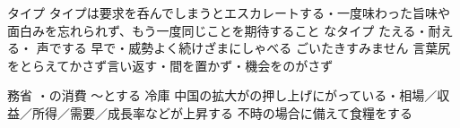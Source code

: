 タイプ
タイプは要求を呑んでしまうとエスカレートする・一度味わった旨味や面白みを忘れられず、もう一度同じことを期待すること
なタイプ
たえる・耐える・
声でする
早で・威勢よく続けざまにしゃべる
ごいたきすみません
言葉尻をとらえてかさず言い返す・間を置かず・機会をのがさず

務省
・の消費
〜とする
冷庫
中国の拡大がの押し上げにがっている・相場／収益／所得／需要／成長率などが上昇する
不時の場合に備えて食糧をする
